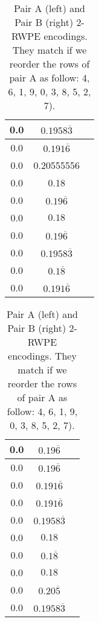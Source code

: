\begin{table}[h]
\footnotesize
  \centering
\begin{tabular}{|c|c|c|}
    \hline
    0.0 & $0.1958\overline{3}$ \\
    \hline
    0.0 & $0.191\overline{6}$ \\
    \hline
    0.0 & 0.20555556 \\
    \hline
    0.0 & 0.18        \\
    \hline
    0.0 & $0.19\overline{6}$ \\
    \hline
    0.0 & $0.18$        \\
    \hline
    0.0 & $0.19\overline{6}$ \\
    \hline
    0.0 & $0.1958\overline{3}$ \\
    \hline
    0.0 & $0.1\overline{8}$ \\
    \hline
    0.0 & $0.191\overline{6}$ \\
    \hline
\end{tabular}
\begin{tabular}{|c|c|c|}
    \hline
     0.0 & $0.19\overline{6}$ \\
    \hline
    0.0 & $0.19\overline{6}$ \\
    \hline
    0.0 & $0.191\overline{6}$ \\
    \hline
    0.0 & $0.191\overline{6}$        \\
    \hline
    0.0 & $0.1958\overline{3}$ \\
    \hline
    0.0 & $0.18$       \\
    \hline
    0.0 & $0.1\overline{8}$ \\
    \hline
    0.0 & $0.18$ \\
    \hline
    0.0 & $0.20\overline{5}$ \\
    \hline
    0.0 & $0.1958\overline{3}$ \\
    \hline
\end{tabular}
  \caption{Pair A (left) and Pair B (right) 2-RWPE encodings. They match if we reorder the rows of pair A as follow: 4, 6, 1, 9, 0, 3, 8, 5, 2, 7).}
  \label{tab:sidetables}
\end{table}


